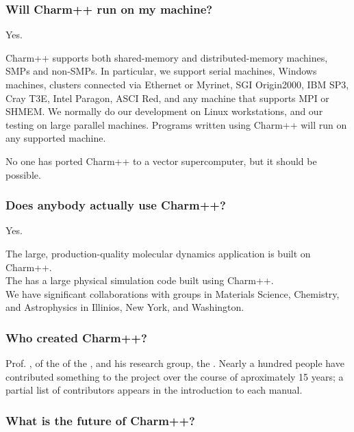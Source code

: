\subsubsection{Will Charm++ run on my machine?}

Yes.

Charm++ supports both shared-memory and distributed-memory machines,
SMPs and non-SMPs. In particular, we support serial machines, Windows
machines, clusters connected via Ethernet or Myrinet, SGI Origin2000, IBM
SP3, Cray T3E, Intel Paragon, ASCI Red, and any machine that supports MPI
or SHMEM. We normally do our development on Linux workstations, and
our testing on large parallel machines. Programs written using Charm++
will run on any supported machine.

No one has ported Charm++ to a vector supercomputer, but it should be
possible.

\subsubsection{Does anybody actually use Charm++?}

Yes.

The large, production-quality molecular dynamics application 
is built on Charm++.\\
The 
has a large physical simulation code built using Charm++.\\
We have significant collaborations with groups in Materials Science,
Chemistry, and Astrophysics in Illinios, New York, and Washington.

\subsubsection{Who created Charm++?}

Prof. , of the
of the ,
and his research group, the .
 Nearly a hundred people have contributed something
to the project over the course of aproximately 15 years; a partial list
of contributors appears in the introduction to each manual.

\subsubsection{What is the future of Charm++?}

